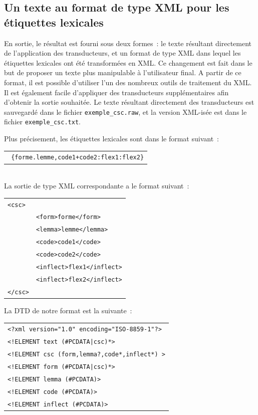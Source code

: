 \subsection{Un texte au format de type XML pour les étiquettes lexicales}

En sortie, le résultat est fourni sous deux formes~: le texte résultant directement de l'application des transducteurs, et un format de type XML dans lequel les étiquettes lexicales ont été transformées en XML.
Ce changement est fait dans le but de proposer un texte plus manipulable  à l'utilisateur final.
A partir de ce format, il est possible d'utiliser l'un des nombreux outils de traitement du XML.
Il est également facile d'appliquer des transducteurs supplémentaires afin d'obtenir la sortie souhaitée.
Le texte résultant directement des transducteurs est sauvegardé dans le fichier  \verb+exemple_csc.raw+, et la version  XML-isée est dans le fichier \verb+exemple_csc.txt+.

Plus précisement, les étiquettes lexicales sont dans le format suivant~:\\
\begin{tabular}{c}
\texttt{
\{forme.lemme,code1+code2:flex1:flex2\}}
\end{tabular}\\
La sortie de type XML correspondante a le format suivant~:\\
\begin{tabular}{ll}
\texttt{<csc>}&\\
	&\texttt{<form>forme</form>}\\
	&\texttt{<lemma>lemme</lemma>}\\
	&\texttt{<code>code1</code>}\\
	&\texttt{<code>code2</code>}\\
	&\texttt{<inflect>flex1</inflect>}\\
	&\texttt{<inflect>flex2</inflect>}\\
\texttt{</csc>}&\\
\end{tabular}

La DTD de notre format est la suivante~:

\begin{tabular}{l}
\texttt{<?xml version="1.0" encoding="ISO-8859-1"?>}\\
\texttt{<!ELEMENT text (\#PCDATA|csc)*>}\\
\texttt{<!ELEMENT csc (form,lemma?,code*,inflect*) >}\\
\texttt{<!ELEMENT form (\#PCDATA|csc)*>}\\
\texttt{<!ELEMENT lemma (\#PCDATA)>}\\
\texttt{<!ELEMENT code (\#PCDATA)>}\\
\texttt{<!ELEMENT inflect (\#PCDATA)>}\\
\end{tabular}

